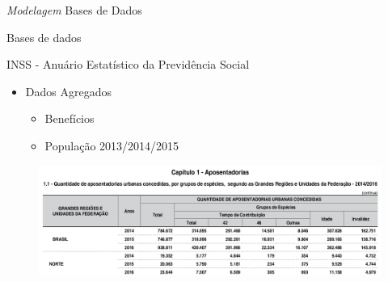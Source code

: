 \begin{frame}{\textit{Modelagem}}
  Bases de Dados
\end{frame}

\begin{frame}{Bases de dados}
  \begin{block}{INSS - Anuário Estatístico da Previdência Social}
    \begin{itemize}
      \item Dados Agregados
      \begin{itemize}
        \item Benefícios
        \item População 2013/2014/2015
      \end{itemize}
    \end{itemize}
  \end{block}
  \begin{figure}[h]
  	\begin{center}
      \includegraphics [scale=0.27]{./Figures/aeps01}
  	\end{center}
  \end{figure}
\end{frame}

